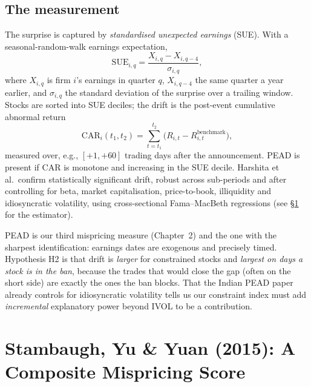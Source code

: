 \subsection*{The measurement}
The surprise is captured by \emph{standardised unexpected earnings} (SUE). With a seasonal-random-walk earnings expectation,
\begin{equation}
\mathrm{SUE}_{i,q} = \frac{X_{i,q} - X_{i,q-4}}{\sigma_{i,q}}, \label{eq:sue}
\end{equation}
where $X_{i,q}$ is firm $i$'s earnings in quarter $q$, $X_{i,q-4}$ the same quarter a year earlier, and $\sigma_{i,q}$ the standard deviation of the surprise over a trailing window. Stocks are sorted into SUE deciles; the drift is the post-event cumulative abnormal return
\begin{equation}
\mathrm{CAR}_i(t_1,t_2) = \sum_{t=t_1}^{t_2}\big(R_{i,t} - R_{i,t}^{\text{benchmark}}\big), \label{eq:car}
\end{equation}
measured over, e.g., $[+1,+60]$ trading days after the announcement. PEAD is present if CAR is monotone and increasing in the SUE decile. Harshita et al.\ confirm statistically significant drift, robust across sub-periods and after controlling for beta, market capitalisation, price-to-book, illiquidity and idiosyncratic volatility, using cross-sectional Fama--MacBeth regressions (see \S\ref{sec:syy} for the estimator).

\begin{takeaway}
PEAD is our third mispricing measure (Chapter~2) and the one with the sharpest identification: earnings dates are exogenous and precisely timed. Hypothesis H2 is that drift is \emph{larger} for constrained stocks and \emph{largest on days a stock is in the ban}, because the trades that would close the gap (often on the short side) are exactly the ones the ban blocks. That the Indian PEAD paper already controls for idiosyncratic volatility tells us our constraint index must add \emph{incremental} explanatory power beyond IVOL to be a contribution.
\end{takeaway}

\section{Stambaugh, Yu \& Yuan (2015): A Composite Mispricing Score}
\label{sec:syy}

